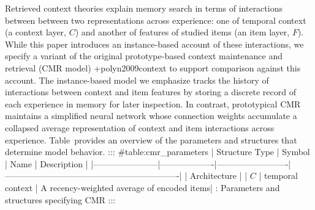 Retrieved context theories explain memory search in terms of interactions between between two representations across experience: one of temporal context (a context layer, $C$) and another of features of studied items (an item layer, $F$). While this paper introduces an instance-based account of these interactions, we specify a variant of the original prototype-based context maintenance and retrieval (CMR model) +{}{}{polyn2009context} to support comparison against this account. The instance-based model we emphasize tracks the history of interactions between context and item features by storing a discrete record of each experience in memory for later inspection. In contrast, prototypical CMR maintains a simplified neural network whose connection weights accumulate a collapsed average representation of context and item interactions across experience. Table provides an overview of the parameters and structures that determine model behavior.\markdownRendererInterblockSeparator
{}::: {#table:cmr_parameters} | Structure Type | Symbol | Name | Description | |-----------------------|-------------------|-------------------------| -------------------------------------------------------------| | Architecture |\markdownRendererLineBreak
{}| $C$ | temporal context | A recency-weighted average of encoded items| \markdownRendererInterblockSeparator
{}: Parameters and structures specifying CMR :::\relax